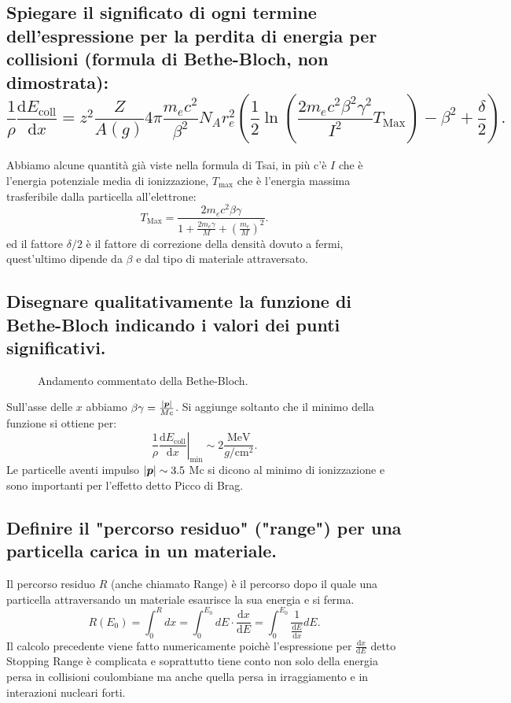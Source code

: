 \subsection[]{Spiegare il significato di ogni termine dell’espressione per la perdita di energia per collisioni (formula di Bethe-Bloch, non dimostrata):
	\[
		\frac{1}{\rho}\frac{\mbox{d} E_{\text{coll}}}{\mbox{d} x} = 
		z^2 \frac{Z}{A\left( g \right) }4\pi \frac{m_e c^2}{\beta^2} N_A r^2_e 
		\left( \frac{1}{2}\ln\left( \frac{2m_e c^2 \beta^2 \gamma^2}{I^2}T_{\text{Max}} \right) - \beta^2 + \frac{\delta}{2} \right) 
	.\] 
}\label{sec:4.a.22}
Abbiamo alcune quantità già viste nella formula di Tsai, in più c'è $I$ che è l'energia potenziale media di ionizzazione, $T_{\text{max}}$ che è l'energia massima trasferibile dalla particella all'elettrone:
\[
	T_{\text{Max}}= \frac{2m_e c^2 \beta\gamma}{1+ \frac{2m_e \gamma}{M}+\left( \frac{m_e}{M} \right) ^2}
.\] 
ed il fattore $\delta /2$ è il fattore di correzione della densità dovuto a fermi, quest'ultimo dipende da $\beta$ e dal tipo di materiale attraversato.

\subsection[]{Disegnare qualitativamente la funzione di Bethe-Bloch indicando i valori dei punti significativi.
}\label{sec:4.a.23}
\begin{figure}[H]
    \centering
    \caption{Andamento commentato della Bethe-Bloch.}
    \label{fig:bethe}
\end{figure}
Sull'asse delle $x$ abbiamo $\beta\gamma = \frac{\left| \boldsymbol{p} \right| }{Mc}$.
Si  aggiunge soltanto che il minimo della funzione si ottiene per:
\[
	\frac{1}{\rho}\left.\frac{\mbox{d} E_{\text{coll}} }{\mbox{d} x} \right|_{\text{min}} \sim 2 \frac{\text{MeV}}{g /\text{cm}^2} 
.\] 
Le particelle aventi impulso $\left| \boldsymbol{p} \right| \sim 3.5$ Mc si dicono al minimo di ionizzazione e sono importanti per l'effetto detto Picco di Brag.

\subsection[]{Definire il "percorso residuo" ("range") per una particella carica in un materiale.
}\label{sec:4.a.24}
Il percorso residuo $R$ (anche chiamato Range) è il percorso dopo il quale una particella attraversando un materiale esaurisce la sua energia e si ferma.\[
	R\left( E_0 \right) = \int_0^{R} dx = \int_0^{E_0} dE \cdot \frac{\mbox{d} x}{\mbox{d} E} =
	\int_0^{E_0}\frac{1}{\frac{\mbox{d} E}{\mbox{d} x} } dE
.\] 
Il calcolo precedente viene fatto numericamente poichè l'espressione per $\frac{\mbox{d} x}{\mbox{d} E}$ detto Stopping Range è complicata e soprattutto tiene conto non solo della energia persa in collisioni coulombiane ma anche quella persa in irraggiamento e in interazioni nucleari forti.
